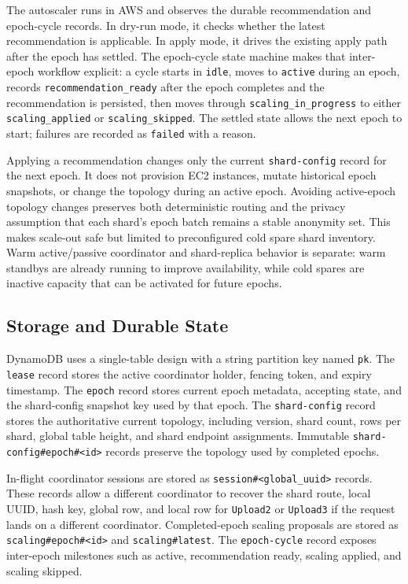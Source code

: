 \documentclass[conference]{IEEEtran}
\begin{document}
The autoscaler runs in AWS and observes the durable recommendation and epoch-cycle records. In dry-run mode, it checks whether the latest recommendation is applicable. In apply mode, it drives the existing apply path after the epoch has settled. The epoch-cycle state machine makes that inter-epoch workflow explicit: a cycle starts in \texttt{idle}, moves to \texttt{active} during an epoch, records \texttt{recommendation\_ready} after the epoch completes and the recommendation is persisted, then moves through \texttt{scaling\_in\_progress} to either \texttt{scaling\_applied} or \texttt{scaling\_skipped}. The settled state allows the next epoch to start; failures are recorded as \texttt{failed} with a reason.

Applying a recommendation changes only the current \texttt{shard-config} record for the next epoch. It does not provision EC2 instances, mutate historical epoch snapshots, or change the topology during an active epoch. Avoiding active-epoch topology changes preserves both deterministic routing and the privacy assumption that each shard's epoch batch remains a stable anonymity set. This makes scale-out safe but limited to preconfigured cold spare shard inventory. Warm active/passive coordinator and shard-replica behavior is separate: warm standbys are already running to improve availability, while cold spares are inactive capacity that can be activated for future epochs.

\subsection{Storage and Durable State}

DynamoDB uses a single-table design with a string partition key named \texttt{pk}. The \texttt{lease} record stores the active coordinator holder, fencing token, and expiry timestamp. The \texttt{epoch} record stores current epoch metadata, accepting state, and the shard-config snapshot key used by that epoch. The \texttt{shard-config} record stores the authoritative current topology, including version, shard count, rows per shard, global table height, and shard endpoint assignments. Immutable \texttt{shard-config\#epoch\#<id>} records preserve the topology used by completed epochs.

In-flight coordinator sessions are stored as \texttt{session\#<global\_uuid>} records. These records allow a different coordinator to recover the shard route, local UUID, hash key, global row, and local row for \texttt{Upload2} or \texttt{Upload3} if the request lands on a different coordinator. Completed-epoch scaling proposals are stored as \texttt{scaling\#epoch\#<id>} and \texttt{scaling\#latest}. The \texttt{epoch-cycle} record exposes inter-epoch milestones such as active, recommendation ready, scaling applied, and scaling skipped.
\end{document}

